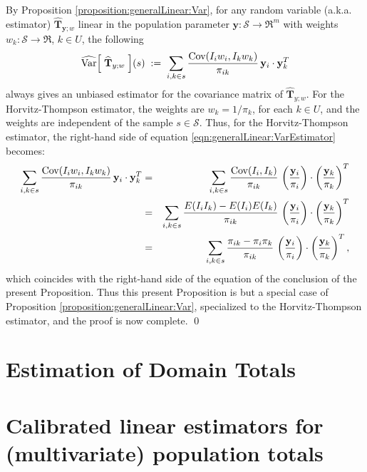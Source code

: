 \documentclass{article}
\begin{document}
\proof
By Proposition \ref{proposition:generalLinear:Var},
for any random variable (a.k.a. estimator) $\widehat{\mathbf{T}}_{\mathbf{y};w}$
linear in the population parameter $\mathbf{y} : \mathcal{S} \longrightarrow \Re^{m}$
with weights $w_{k} : \mathcal{S} \longrightarrow \Re$, $k \in U$, the following
\begin{equation}
\label{eqn:generalLinear:VarEstimator}
\widehat{\textnormal{Var}}\!\left[\;\widehat{\mathbf{T}}_{y;w}\;\right]\!(s)
\;:=\; \sum_{i,k \in s}\dfrac{\textnormal{Cov}(I_{i}w_{i},I_{k}w_{k})}{\pi_{ik}}\,\mathbf{y}_{i}\cdot\mathbf{y}_{k}^{T}
\end{equation}
always gives an unbiased estimator for the covariance matrix of $\widehat{\mathbf{T}}_{y;w}$.
For the Horvitz-Thompson estimator, the weights are $w_{k} = 1/\pi_{k}$, for each $k \in U$,
and the weights are independent of the sample $s \in \mathcal{S}$.
Thus, for the Horvitz-Thompson estimator, the right-hand side of equation
\eqref{eqn:generalLinear:VarEstimator} becomes:
\begin{eqnarray*}
\sum_{i,k \in s}\dfrac{\textnormal{Cov}(I_{i}w_{i},I_{k}w_{k})}{\pi_{ik}}\,\mathbf{y}_{i}\cdot\mathbf{y}_{k}^{T}
&=&\sum_{i,k \in s}\dfrac{\textnormal{Cov}(I_{i},I_{k})}{\pi_{ik}}\,\left(\dfrac{\mathbf{y}_{i}}{\pi_{i}}\right)\cdot\left(\dfrac{\mathbf{y}_{k}}{\pi_{k}}\right)^{T} \\
&=&\sum_{i,k \in s}\dfrac{E(I_{i}I_{k})-E(I_{i})E(I_{k})}{\pi_{ik}}\,\left(\dfrac{\mathbf{y}_{i}}{\pi_{i}}\right)\cdot\left(\dfrac{\mathbf{y}_{k}}{\pi_{k}}\right)^{T} \\
&=&\sum_{i,k \in s}\dfrac{\pi_{ik}-\pi_{i}\pi_{k}}{\pi_{ik}}\,\left(\dfrac{\mathbf{y}_{i}}{\pi_{i}}\right)\cdot\left(\dfrac{\mathbf{y}_{k}}{\pi_{k}}\right)^{T},
\end{eqnarray*}
which coincides with the right-hand side of the equation of the conclusion of the present Proposition.
Thus this present Proposition is but a special case of Proposition \ref{proposition:generalLinear:Var},
specialized to the Horvitz-Thompson estimator, and the proof is now complete. \qed


\section{Estimation of Domain Totals}
\setcounter{theorem}{0}


\section{Calibrated linear estimators for (multivariate) population totals}
\setcounter{theorem}{0}
\end{document}
